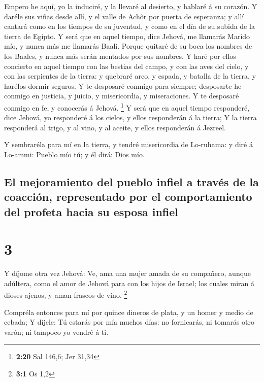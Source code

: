  Empero he aquí, yo la induciré, y la llevaré al desierto,
y hablaré á su corazón.  Y daréle sus viñas desde allí, y
el valle de Achôr por puerta de esperanza; y allí cantará como en los
tiempos de su juventud, y como en el día de su subida de la tierra de
Egipto.  Y será que en aquel tiempo, dice Jehová, me
llamarás Marido mío, y nunca más me llamarás Baali.  Porque
quitaré de su boca los nombres de los Baales, y nunca más serán mentados
por sus nombres.  Y haré por ellos concierto en aquel
tiempo con las bestias del campo, y con las aves del cielo, y con las
serpientes de la tierra: y quebraré arco, y espada, y batalla de la
tierra, y harélos dormir seguros.  Y te desposaré conmigo
para siempre; desposarte he conmigo en justicia, y juicio, y
misericordia, y miseraciones.  Y te desposaré conmigo en
fe, y conocerás á Jehová. \footnote{\textbf{2:20} Sal 146,6; Jer 31,34}
 Y será que en aquel tiempo responderé, dice Jehová, yo
responderé á los cielos, y ellos responderán á la tierra; 
Y la tierra responderá al trigo, y al vino, y al aceite, y ellos
responderán á Jezreel.

 Y sembraréla para mí en la tierra, y tendré misericordia
de Lo-ruhama: y diré á Lo-ammi: Pueblo mío tú; y él dirá: Dios mío.

\hypertarget{el-mejoramiento-del-pueblo-infiel-a-travuxe9s-de-la-coacciuxf3n-representado-por-el-comportamiento-del-profeta-hacia-su-esposa-infiel}{%
\subsection{El mejoramiento del pueblo infiel a través de la coacción,
representado por el comportamiento del profeta hacia su esposa
infiel}\label{el-mejoramiento-del-pueblo-infiel-a-travuxe9s-de-la-coacciuxf3n-representado-por-el-comportamiento-del-profeta-hacia-su-esposa-infiel}}

\hypertarget{section-2}{%
\section{3}\label{section-2}}

 Y díjome otra vez Jehová: Ve, ama una mujer amada de su
compañero, aunque adúltera, como el amor de Jehová para con los hijos de
Israel; los cuales miran á dioses ajenos, y aman frascos de vino.
\footnote{\textbf{3:1} Os 1,2}

 Compréla entonces para mí por quince dineros de plata, y un
homer y medio de cebada;  Y díjele: Tú estarás por mía
muchos días: no fornicarás, ni tomarás otro varón; ni tampoco yo vendré
á ti.

